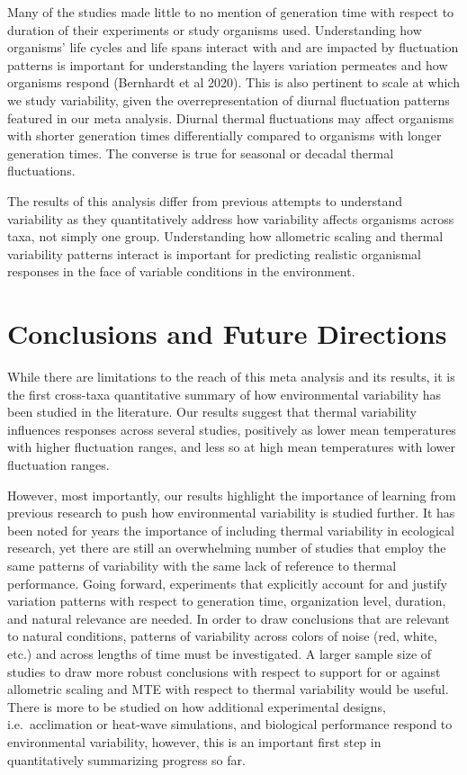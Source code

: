 \documentclass[12pt,twoside]{reedthesis}
\begin{document}
Many of the studies made little to no mention of generation time with respect to duration of their experiments or study organisms used. Understanding how organisms' life cycles and life spans interact with and are impacted by fluctuation patterns is important for understanding the layers variation permeates and how organisms respond (Bernhardt et al 2020). This is also pertinent to scale at which we study variability, given the overrepresentation of diurnal fluctuation patterns featured in our meta analysis. Diurnal thermal fluctuations may affect organisms with shorter generation times differentially compared to organisms with longer generation times. The converse is true for seasonal or decadal thermal fluctuations.

The results of this analysis differ from previous attempts to understand variability as they quantitatively address how variability affects organisms across taxa, not simply one group. Understanding how allometric scaling and thermal variability patterns interact is important for predicting realistic organismal responses in the face of variable conditions in the environment.

\hypertarget{conclusions-and-future-directions}{%
\chapter*{Conclusions and Future Directions}\label{conclusions-and-future-directions}}

While there are limitations to the reach of this meta analysis and its results, it is the first cross-taxa quantitative summary of how environmental variability has been studied in the literature. Our results suggest that thermal variability influences responses across several studies, positively as lower mean temperatures with higher fluctuation ranges, and less so at high mean temperatures with lower fluctuation ranges.

However, most importantly, our results highlight the importance of learning from previous research to push how environmental variability is studied further. It has been noted for years the importance of including thermal variability in ecological research, yet there are still an overwhelming number of studies that employ the same patterns of variability with the same lack of reference to thermal performance. Going forward, experiments that explicitly account for and justify variation patterns with respect to generation time, organization level, duration, and natural relevance are needed. In order to draw conclusions that are relevant to natural conditions, patterns of variability across colors of noise (red, white, etc.) and across lengths of time must be investigated. A larger sample size of studies to draw more robust conclusions with respect to support for or against allometric scaling and MTE with respect to thermal variability would be useful. There is more to be studied on how additional experimental designs, i.e.~acclimation or heat-wave simulations, and biological performance respond to environmental variability, however, this is an important first step in quantitatively summarizing progress so far.
\end{document}
